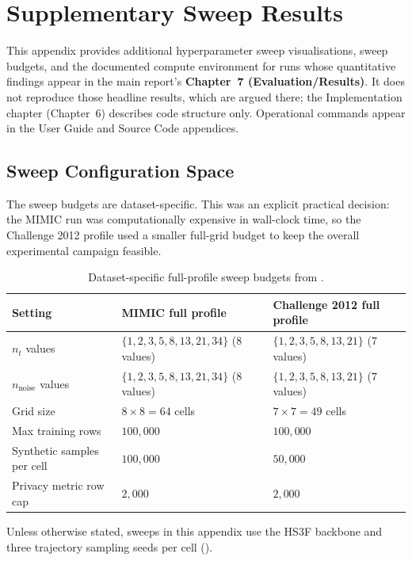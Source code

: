 \chapter{Supplementary Sweep Results}

This appendix provides additional hyperparameter sweep visualisations, sweep budgets, and the documented compute environment for runs whose quantitative findings appear in the main report's \textbf{Chapter~7 (Evaluation/Results)}. It does not reproduce those headline results, which are argued there; the Implementation chapter (Chapter~6) describes code structure only. Operational commands appear in the User Guide and Source Code appendices.

\section{Sweep Configuration Space}

The sweep budgets are dataset-specific. This was an explicit practical decision:
the MIMIC run was computationally expensive in wall-clock time, so the
Challenge 2012 profile used a smaller full-grid budget to keep the overall
experimental campaign feasible.

\begin{table}[htbp]
\centering
\small
\begin{tabular}{p{}p{}p{}}
\toprule
\textbf{Setting} & \textbf{MIMIC full profile} & \textbf{Challenge 2012 full profile} \\
\midrule
$n_t$ values & $\{1, 2, 3, 5, 8, 13, 21, 34\}$ ($8$ values) & $\{1, 2, 3, 5, 8, 13, 21\}$ ($7$ values) \\
$n_{\text{noise}}$ values & $\{1, 2, 3, 5, 8, 13, 21, 34\}$ ($8$ values) & $\{1, 2, 3, 5, 8, 13, 21\}$ ($7$ values) \\
Grid size & $8 \times 8 = 64$ cells & $7 \times 7 = 49$ cells \\
Max training rows & $100{,}000$ & $100{,}000$ \\
Synthetic samples per cell & $100{,}000$ & $50{,}000$ \\
Privacy metric row cap & $2{,}000$ & $2{,}000$ \\
\bottomrule
\end{tabular}
\caption{Dataset-specific full-profile sweep budgets from .}
\label{tab:dataset-sweep-budgets}
\end{table}

Unless otherwise stated, sweeps in this appendix use the HS3F backbone and three
trajectory sampling seeds per cell
().

